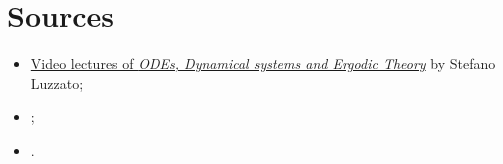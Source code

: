 \documentclass[dvipsnames, 11pt]{article}
\begin{document}
\section{Sources}\label{sec00}
\begin{itemize}
        \item \href{https://www.stefanoluzzatto.net/videos.html}{Video lectures of \textit{ODEs, Dynamical systems and Ergodic Theory}} by Stefano Luzzato;
        \item \href{}{};
        \item \href{}{}.
\end{itemize}



\printbibliography
\end{document}
